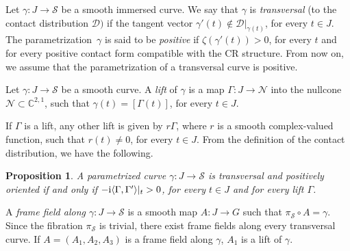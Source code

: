 \documentclass[10pt,a4paper]{amsart}
\numberwithin{equation}{section}
\newtheorem{Proposition}[Theorem]{Proposition}
 { \theoremstyle{definition}
\newtheorem{Definition}[Theorem]{Definition}
\newtheorem{Note}[Theorem]{Note}
\newtheorem{Example}[Theorem]{Example}
\newtheorem{Remark}[Theorem]{Remark} }
\def\C{\mathbb{C}}
\def\S{\mathcal{S}}
\def\S{\mathcal{S}}
\begin{document}
\begin{Definition}
Let $\gamma \colon J \to\S$ be a smooth immersed curve. We say that $\gamma$ is \emph{transversal} (to the contact
distribution $\mathcal{D})$ if the tangent vector ${\gamma'}(t) \not\in \mathcal{D}|_{\gamma(t)}$, for every $t \in J$.
The parametrization~$\gamma$ is said to be
\emph{positive} if $\zeta({\gamma'}(t) ) > 0$, for every $t$ and for every positive contact form compatible
with the CR structure.
From now on, we assume that the parametrization of a transversal curve is positive.
\end{Definition}


\begin{Definition}
Let $\gamma\colon J \to\S$ be a smooth curve.
A \emph{lift} of $\gamma$ is a map $\Gamma\colon J \to \mathcal{N}$ into the nullcone $\mathcal{N}\subset\C^{2,1}$,
such that $\gamma(t) = [\Gamma(t)]$, for every $t \in J$.
 \end{Definition}

If $\Gamma$ is a lift, any other lift is given by $r\Gamma$, where $r$ is a smooth complex-valued function,
such that $r(t)\neq 0$, for every $t \in J$.
 From the definition of the contact distribution, we have the following.

 \begin{Proposition}
 A parametrized curve $\gamma \colon J \to\S$ is transversal
 and positively oriented if and only if
 $- {\rm i}\langle \Gamma,\Gamma'\rangle|_t > 0$, for every $t\in J$ and for every lift $\Gamma$.
 \end{Proposition}

\begin{Definition}
A \emph{frame field along $\gamma \colon J \to \S$} is a smooth map $A \colon J \to {G}$
%
such that ${\pi_\S \circ A = \gamma}$. Since the fibration $\pi_{\mathcal{S}}$
is trivial, there exist frame fields along every transversal curve.
If $A=(A_1,A_2,A_3)$ is a frame field along $\gamma$, $A_1$ is a lift of $\gamma$.
\end{Definition}
\end{document}
